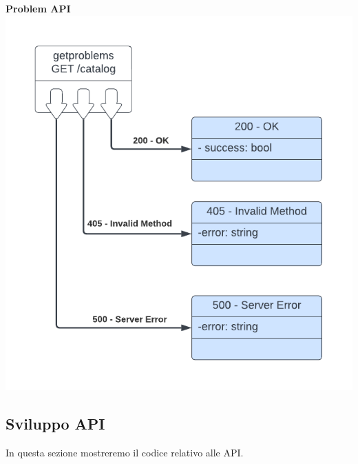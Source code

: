 \documentclass[11pt, a4paper]{article}
\theoremstyle{definition}
\begin{document}
\newpage
\textbullet \textbf{ Problem API}\\
\includegraphics[width=\textwidth]{materiale/Resource Models Problems.pdf}

\newpage
\subsection{Sviluppo API}
In questa sezione mostreremo il codice relativo alle API.
\end{document}
